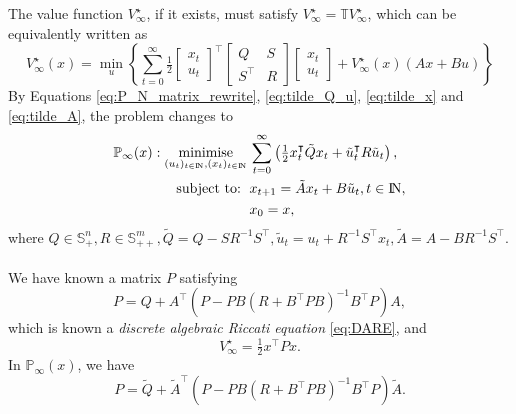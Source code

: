 \documentclass[a4paper,11pt,reqno]{amsart}
\newcommand{\N}{{\rm I\!N}}
\newcommand{\tran}{\intercal}
\DeclareMathOperator*{\minimise}{minimise}
\begin{document}
The value function $V^{\star}_{\infty}$, if it exists, must satisfy $V^{\star}_{\infty}=\mathbb{T}V^{\star}_{\infty}$, which can be equivalently written as
\begin{equation}
    V_{\infty}^{\star}(x)=\min_u
    \left\{
    \sum_{t=0}^{\infty}\tfrac{1}{2}
        \begin{bmatrix}
            x_t\\
            u_t
        \end{bmatrix}^{\tran}
        \begin{bmatrix}
            Q&S\\
            S^{\tran}&R
        \end{bmatrix}
        \begin{bmatrix}
            x_t\\
            u_t
        \end{bmatrix}
        +V_{\infty}^{\star}(x)(Ax+Bu)
    \right\} 
\end{equation}
By Equations \eqref{eq:P_N_matrix_rewrite}, \eqref{eq:tilde_Q_u}, \eqref{eq:tilde_x} and \eqref{eq:tilde_A}, the problem changes to 
\begin{subequations}
    \begin{align}
        \mathbb{P}_{\infty}(x): \minimise_{(u_t)_{t\in \N},(x_t)_{t\in \N}} \,
         & \sum_{t=0}^{\infty}\left(\textstyle\frac{1}{2}
         x_t^{\tran}\tilde{Q}x_t+\tilde{u}_t^{\tran}R\tilde{u}_t\right),
        \\
        \text{subject to: }\,
         & x_{t+1} = \tilde{A}x_t+B\tilde{u}_t, t\in\N,
        \\
         & x_{0} = x,
    \end{align}
\end{subequations}
where $Q\in \mathbb{S}^n_+, R\in \mathbb{S}^m_{++}, \tilde{Q}=Q-SR^{-1}S^{\tran}, \tilde{u}_t=u_t+R^{-1}S^{\tran}x_t, \tilde{A}=A-BR^{-1}S^{\tran}$.
\\ \\
We have known a matrix $P$ satisfying
\begin{equation}
    P=Q+A^{\tran}(P-PB(R+B^{\tran}PB)^{-1}B^{\tran}P)A,
    \tag{DARE}
    \label{eq:DARE}
\end{equation}
which is known a \emph{discrete algebraic Riccati equation} \eqref{eq:DARE}, and
\begin{equation}
    V^{\star}_{\infty}=\tfrac{1}{2}x^{\tran}Px.
\end{equation}
In $\mathbb{P}_{\infty}(x)$, we have
\begin{equation}
    P=\tilde{Q}+\tilde{A}^{\tran}(P-PB(R+B^{\tran}PB)^{-1}B^{\tran}P)\tilde{A}.
    \label{eq:P_N}
\end{equation}
\end{document}
